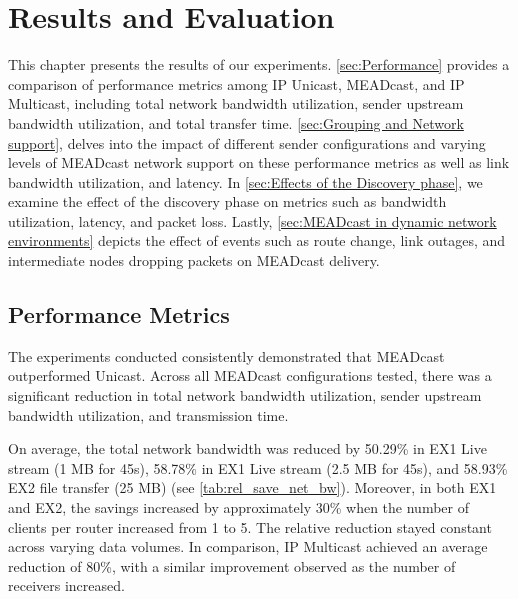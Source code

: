 \chapter{Results and Evaluation} %
\label{chap:Evaluation}
This chapter presents the results of our experiments.
\autoref{sec:Performance} provides a comparison of performance metrics among IP
    Unicast, MEADcast, and IP Multicast, including total network bandwidth
    utilization, sender upstream bandwidth utilization, and total transfer
    time.
\autoref{sec:Grouping and Network support}, delves into the impact of different
    sender configurations and varying levels of MEADcast network support on
    these performance metrics as well as link bandwidth utilization, and
    latency.
In \autoref{sec:Effects of the Discovery phase}, we examine the effect of the
    discovery phase on metrics such as bandwidth utilization, latency, and
    packet loss.
Lastly, \autoref{sec:MEADcast in dynamic network environments} depicts the
    effect of events such as route change, link outages, and intermediate nodes
    dropping packets on MEADcast delivery.

\section{Performance Metrics} %
\label{sec:Performance}
The experiments conducted consistently demonstrated that MEADcast outperformed
    Unicast.
Across all MEADcast configurations tested, there was a significant reduction in
    total network bandwidth utilization, sender upstream bandwidth utilization,
    and transmission time.

On average, the total network bandwidth was reduced by 50.29\% in EX1 Live
    stream (1 MB for 45s), 58.78\% in EX1 Live stream (2.5 MB for 45s), and
    58.93\% EX2 file transfer (25 MB) (see \autoref{tab:rel_save_net_bw}).
Moreover, in both EX1 and EX2, the savings increased by approximately 30\%
    when the number of clients per router increased from 1 to 5.
The relative reduction stayed constant across varying data volumes.
In comparison, IP Multicast achieved an average reduction of 80\%, with a
    similar improvement observed as the number of receivers increased.

